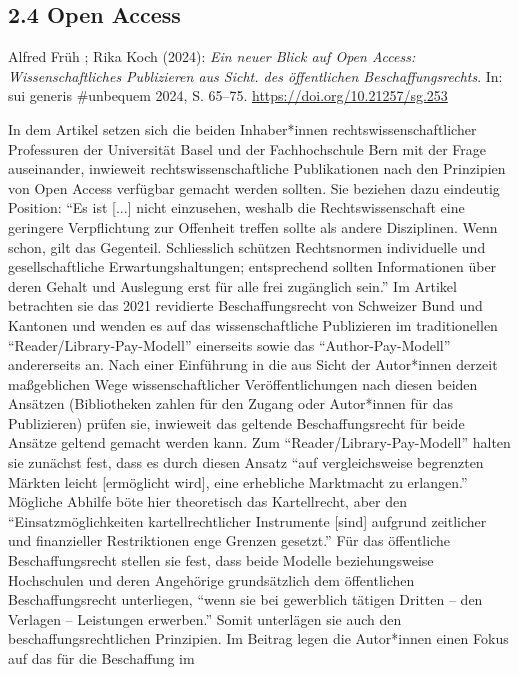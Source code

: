 \documentclass[a4paper,
fontsize=11pt,
oneside,
numbers=noperiodatend,
parskip=half-,
bibliography=totoc,
final
]{scrartcl}
\begin{document}
\subsection{2.4 Open Access}\label{open-access}

Alfred Früh ; Rika Koch (2024): \emph{Ein neuer Blick auf Open Access:
Wissenschaftliches Publizieren aus Sicht. des öffentlichen
Beschaffungsrechts}. In: sui generis \#unbequem 2024, S. 65--75.
\url{https://doi.org/10.21257/sg.253}

In dem Artikel setzen sich die beiden Inhaber*innen
rechtswissenschaftlicher Professuren der Universität Basel und der
Fachhochschule Bern mit der Frage auseinander, inwieweit
rechtswissenschaftliche Publikationen nach den Prinzipien von Open
Access verfügbar gemacht werden sollten. Sie beziehen dazu eindeutig
Position: ``Es ist {[}...{]} nicht einzusehen, weshalb die
Rechtswissenschaft eine geringere Verpflichtung zur Offenheit treffen
sollte als andere Disziplinen. Wenn schon, gilt das Gegenteil.
Schliesslich schützen Rechtsnormen individuelle und gesellschaftliche
Erwartungshaltungen; entsprechend sollten Informationen über deren
Gehalt und Auslegung erst für alle frei zugänglich sein.'' Im Artikel
betrachten sie das 2021 revidierte Beschaffungsrecht von Schweizer Bund
und Kantonen und wenden es auf das wissenschaftliche Publizieren im
traditionellen ``Reader/Library-Pay-Modell'' einerseits sowie das
``Author-Pay-Modell'' andererseits an. Nach einer Einführung in die aus
Sicht der Autor*innen derzeit maßgeblichen Wege wissenschaftlicher
Veröffentlichungen nach diesen beiden Ansätzen (Bibliotheken zahlen für
den Zugang oder Autor*innen für das Publizieren) prüfen sie, inwieweit
das geltende Beschaffungsrecht für beide Ansätze geltend gemacht werden
kann. Zum ``Reader/Library-Pay-Modell'' halten sie zunächst fest, dass
es durch diesen Ansatz ``auf vergleichsweise begrenzten Märkten leicht
{[}ermöglicht wird{]}, eine erhebliche Marktmacht zu erlangen.''
Mögliche Abhilfe böte hier theoretisch das Kartellrecht, aber den
``Einsatzmöglichkeiten kartellrechtlicher Instrumente {[}sind{]}
aufgrund zeitlicher und finanzieller Restriktionen enge Grenzen
gesetzt.'' Für das öffentliche Beschaffungsrecht stellen sie fest, dass
beide Modelle beziehungsweise Hochschulen und deren Angehörige
grundsätzlich dem öffentlichen Beschaffungsrecht unterliegen, ``wenn sie
bei gewerblich tätigen Dritten -- den Verlagen -- Leistungen erwerben.''
Somit unterlägen sie auch den beschaffungsrechtlichen Prinzipien. Im
Beitrag legen die Autor*innen einen Fokus auf das für die Beschaffung im
\end{document}
